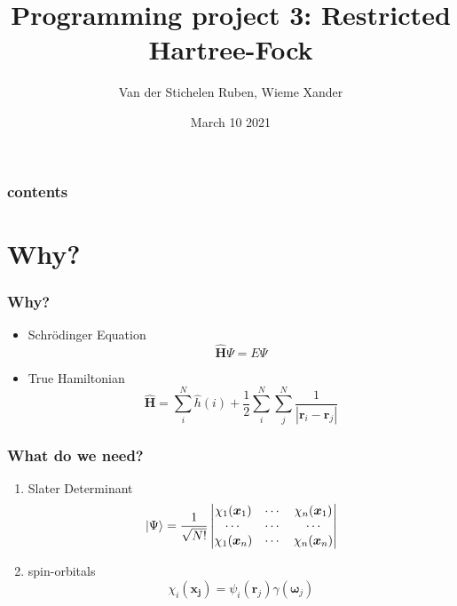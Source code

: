 \documentclass{beamer}
\title{Programming project 3: Restricted Hartree-Fock}
\author{Van der Stichelen Ruben, Wieme Xander}
\institute{Ghent University}
\date{March 10 2021}
\begin{document}
\begin{frame}
    \titlepage
\end{frame}

\begin{frame}
    \frametitle{contents}
    \tableofcontents
\end{frame}

\section{Why?}
\label{sec:why}
\begin{frame}
    \frametitle{Why?}
    \begin{itemize}
        \item Schrödinger Equation
        \begin{equation*}
            \hat{\boldsymbol{H}}\Psi = E\Psi
        \end{equation*}
        \item True Hamiltonian
        \begin{equation*}
            \hat{\boldsymbol{H}} = \sum_i^N\hat{h}(i) + \frac{1}{2}\sum_i^N\sum_j^N\frac{1}{|\boldsymbol{r}_i - \boldsymbol{r}_j|} 
        \end{equation*}
    \end{itemize}
\end{frame}

\begin{frame}
    \frametitle{What do we need?}
    \begin{enumerate}
        \item Slater Determinant
        \begin{equation*}
            \ket{\Psi} = \frac{1}{\sqrt{N!}}\begin{vmatrix}
                \chi_1(\boldsymbol{x}_1) & \cdots & \chi_n(\boldsymbol{x}_1) \\
                \cdots & \cdots & \cdots \\
                \chi_1(\boldsymbol{x}_n) & \cdots & \chi_n(\boldsymbol{x}_n)\\
            \end{vmatrix}
        \end{equation*}
        \item spin-orbitals
        \begin{equation*}
            \chi_i(\boldsymbol{x_j}) = \psi_i(\boldsymbol{r}_j)\gamma(\boldsymbol{\omega}_j)
        \end{equation*}
    \end{enumerate}
\end{frame}
\end{document}
